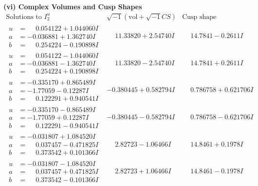 \documentclass[1p]{elsarticle_modified}
\theoremstyle{definition}
\newcommand{\I}{\sqrt{-1}}
\begin{document}
\newpage\flushleft \textbf{(vi) Complex Volumes and Cusp Shapes}
$$\begin{array}{c|c|c}  
\text{Solutions to }I^u_{2}& \I (\text{vol} + \sqrt{-1}CS) & \text{Cusp shape}\\
 \hline 
\begin{aligned}
u &= \phantom{-}0.054122 + 1.044060 I \\
a &= -0.036881 + 1.362740 I \\
b &= \phantom{-}0.254224 - 0.190898 I\end{aligned}
 & \phantom{-}11.33820 + 2.54740 I & \phantom{-}14.7841 - 0.2611 I \\ \hline\begin{aligned}
u &= \phantom{-}0.054122 - 1.044060 I \\
a &= -0.036881 - 1.362740 I \\
b &= \phantom{-}0.254224 + 0.190898 I\end{aligned}
 & \phantom{-}11.33820 - 2.54740 I & \phantom{-}14.7841 + 0.2611 I \\ \hline\begin{aligned}
u &= -0.335170 + 0.865489 I \\
a &= -1.77059 - 0.12287 I \\
b &= \phantom{-}0.122291 + 0.940541 I\end{aligned}
 & -0.380445 + 0.582794 I & \phantom{-}0.786758 + 0.621706 I \\ \hline\begin{aligned}
u &= -0.335170 - 0.865489 I \\
a &= -1.77059 + 0.12287 I \\
b &= \phantom{-}0.122291 - 0.940541 I\end{aligned}
 & -0.380445 - 0.582794 I & \phantom{-}0.786758 - 0.621706 I \\ \hline\begin{aligned}
u &= -0.031807 + 1.084520 I \\
a &= \phantom{-}0.037457 - 0.471825 I \\
b &= \phantom{-}0.373542 + 0.101366 I\end{aligned}
 & \phantom{-}2.82723 - 1.06466 I & \phantom{-}14.8461 + 0.1978 I \\ \hline\begin{aligned}
u &= -0.031807 - 1.084520 I \\
a &= \phantom{-}0.037457 + 0.471825 I \\
b &= \phantom{-}0.373542 - 0.101366 I\end{aligned}
 & \phantom{-}2.82723 + 1.06466 I & \phantom{-}14.8461 - 0.1978 I \\ \hline\begin{aligned}

\end{aligned}
\end{array}$$
\end{document}
